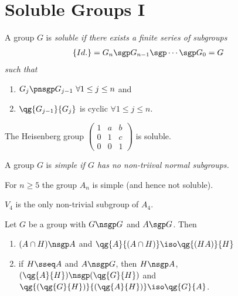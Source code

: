 \documentclass[a4paper]{article}
\begin{document}
\section{Soluble Groups I}

\begin{tdefinition}
  A group \( G \) is \it{soluble} if there exists a finite series of subgroups \begin{align*}
    \left\{ Id. \right\} &= G_n \sgp G_{n-1} \sgp \cdots \sgp G_0 = G
  \end{align*}
  such that \begin{enumerate}
    \item \( G_j \pnsgp G_{j-1} \ \forall 1\le j\le n \) and
    \item \( \qg{G_{j-1}}{G_j} \) is cyclic \( \forall 1\le j\le n  \).
  \end{enumerate}
\end{tdefinition}

\begin{texercise}
  The Heisenberg group \( \begin{pmatrix}
    1 & a &b \\ 0 &1 &c \\ 0 & 0 & 1
  \end{pmatrix} \) is soluble.
\end{texercise}

\begin{tdefinition}
  A group \( G \) is \it{simple} if \( G \) has no non-triival normal subgroups.
\end{tdefinition}

\begin{tlemma}
  For \( n\geq 5 \) the group \( A_n \) is simple (and hence not soluble).
\end{tlemma}

\begin{texercise}
  \( V_4 \) is the only non-trivial subgroup of \( A_4 \).
\end{texercise}

\begin{tlemma}
  Let \( G \) be a group with \( G\nsgp G \) and \( A\sgp G \).
  Then
  \begin{enumerate}
    \item \( (A\cap H)\nsgp A \) and \( \qg{A}{(A\cap H)}\iso \qg{(HA)}{H} \)
    \item if \( H\sseq A \) and \( A\nsgp G \), then \( H\nsgp A \), \( (\qg{A}{H})\nsgp (\qg{G}{H}) \) and \( \qg{(\qg{G}{H})}{(\qg{A}{H})}\iso \qg{G}{A} \).
  \end{enumerate}
\end{tlemma}
\end{document}
